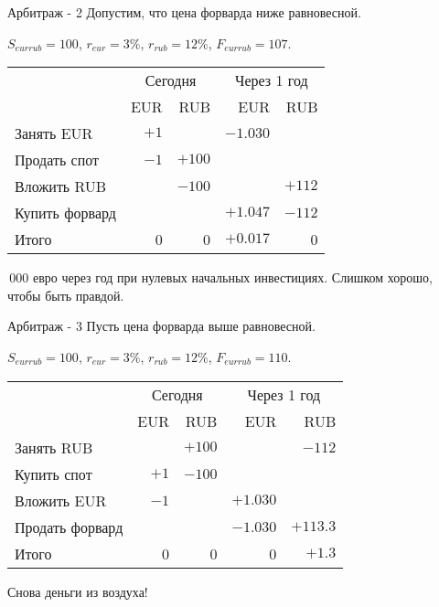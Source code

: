 \documentclass{beamer}
\begin{document}
\begin{frame}{Арбитраж - 2}
\justify
Допустим, что цена форварда ниже равновесной.

$S_{eurrub}=100$, $r_{eur}=3\%$, $r_{rub}=12\%$, $F_{eurrub}=107$. 

\justify
\begin{tabular}{l|r|r|r|r}
& \multicolumn{2}{c|}{Сегодня} & \multicolumn{2}{c}{Через 1 год} \\ \cline{2-5}
& EUR & RUB & EUR & RUB \\ \hline
Занять EUR     & $+1$ &                                   & $-1.030$ & \\
Продать спот           & $-1$ & $+100$ &                               & \\
Вложить RUB    &                                & $-100$  &                                & $+112$ \\
Купить форвард &                               &                                 & $+1.047$ & $-112$ \\ \hline
Итого & 0 & 0 & $+0.017$ & 0
\end{tabular}

\,000 евро через год при нулевых начальных инвестициях. Слишком хорошо, чтобы быть правдой.
\end{frame}



\begin{frame}{Арбитраж - 3}
\justify
Пусть цена форварда выше равновесной.

$S_{eurrub}=100$, $r_{eur}=3\%$, $r_{rub}=12\%$, $F_{eurrub}=110$. 

\justify
\begin{tabular}{l|r|r|r|r}
& \multicolumn{2}{c|}{Сегодня} & \multicolumn{2}{c}{Через 1 год} \\ \cline{2-5}
& EUR & RUB & EUR & RUB \\ \hline
Занять RUB     &                               & $+100$  &                            & $-112$  \\
Купить спот            & $+1$ & $-100$ &                               &   \\
Вложить EUR    &  $-1$  &                                 & $+1.030$ &  \\
Продать форвард &                               &                                & $-1.030$ & $+113.3$ \\ \hline
Итого & 0 & 0 & 0 & $+1.3$
\end{tabular}

\justify
Снова деньги из воздуха!
\end{frame}
\end{document}
